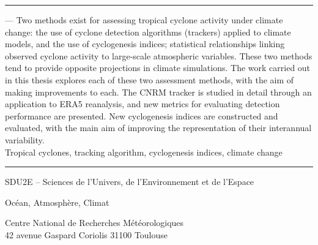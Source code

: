 \documentclass[../main.tex]{subfiles}
\begin{document}
\vspace{5mm}
\noindent\rule[2pt]{\textwidth}{0.5pt}
 --- Two methods exist for assessing tropical cyclone activity under climate change: the use of cyclone detection
algorithms (trackers) applied to climate models, and the use of cyclogenesis indices; statistical relationships linking observed cyclone activity to large-scale
atmospheric variables. These two methods tend to provide opposite projections in climate simulations. The work carried out in this thesis explores each of these
two assessment methods, with the aim of making improvements to each. The CNRM tracker is studied in detail through an application to ERA5 reanalysis, and new
metrics for evaluating detection performance are presented. New cyclogenesis indices are constructed and evaluated, with the main aim of improving the
representation of their interannual variability.\\
    Tropical cyclones, tracking algorithm, cyclogenesis indices, climate change
\\
\noindent\rule[2pt]{\textwidth}{0.5pt}

\vspace{1cm}
SDU2E -- Sciences de l'Univers, de l'Environnement et de l'Espace

Océan, Atmosphère, Climat
\\

\vspace{6mm}
\begin{center}
  Centre National de Recherches Météorologiques\\
  42 avenue Gaspard Coriolis 31100 Toulouse
\end{center}
\end{document}

